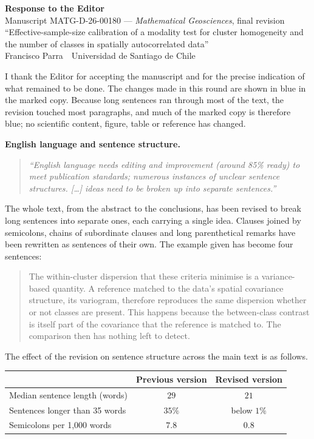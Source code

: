 \documentclass[11pt]{article}
\newcommand{\R}[1]{\medskip\noindent\textbf{#1}\quad}
\newenvironment{rquote}{\begin{quote}\itshape}{\end{quote}}
\begin{document}
\begin{center}
{\LARGE\bfseries Response to the Editor}\\[6pt]
{\large Manuscript MATG-D-26-00180 --- \emph{Mathematical Geosciences},
final revision}\\[4pt]
``Effective-sample-size calibration of a modality test for cluster homogeneity
and the number of classes in spatially autocorrelated data''\\[4pt]
Francisco Parra \,\textperiodcentered\, Universidad de Santiago de Chile
\end{center}
\medskip

I thank the Editor for accepting the manuscript and for the precise
indication of what remained to be done. The changes made in this round are
shown in blue in the marked copy. Because long sentences ran through most of the
text, the revision touched most paragraphs, and much of the marked copy is
therefore blue; no scientific content, figure, table or reference has changed.

\R{English language and sentence structure.}
\begin{rquote}
``English language needs editing and improvement (around 85\% ready) to meet
publication standards; numerous instances of unclear sentence structures.
[\dots] ideas need to be broken up into separate sentences.''
\end{rquote}
The whole text, from the abstract to the conclusions, has been revised to
break long sentences into separate ones, each carrying a single idea. Clauses
joined by semicolons, chains of subordinate clauses and long parenthetical
remarks have been rewritten as sentences of their own. The example given has
become four sentences:
\begin{quote}
The within-cluster dispersion that these criteria minimise is a
variance-based quantity. A reference matched to the data's spatial covariance
structure, its variogram, therefore reproduces the same dispersion whether or
not classes are present. This happens because the between-class contrast is
itself part of the covariance that the reference is matched to. The comparison
then has nothing left to detect.
\end{quote}
The effect of the revision on sentence structure across the main text is as
follows.

\begin{center}
\begin{tabular}{lcc}
\toprule
 & Previous version & Revised version\\
\midrule
Median sentence length (words) & $29$ & $21$\\
Sentences longer than 35 words & $35\%$ & below $1\%$\\
Semicolons per 1{,}000 words & $7.8$ & $0.8$\\
\bottomrule
\end{tabular}
\end{center}
\end{document}

